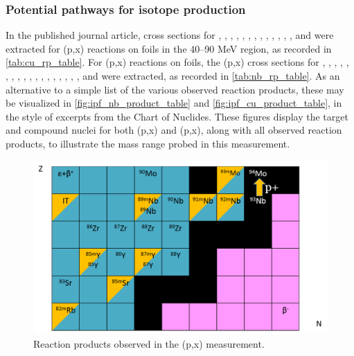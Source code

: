\subsubsection{Potential pathways for isotope production }


In the published journal article, cross sections for  ,  , , , , , , ,  , , , , , and  were extracted for (p,x) reactions  on  foils in the 40--90 MeV region, as recorded in \autoref{tab:cu_rp_table}.
For  (p,x) reactions on  foils, the (p,x) cross sections for , , , , , , , , , , , , , , , , , , and  were extracted, as recorded in \autoref{tab:nb_rp_table}.
As an alternative to a simple list of the various observed reaction products, these may be visualized in \autoref{fig:ipf_nb_product_table} and \autoref{fig:ipf_cu_product_table}, in the style of excerpts from the Chart of  Nuclides.
These figures display the target and compound nuclei  for both  (p,x) and (p,x), along with all observed reaction products, to illustrate the mass range probed in this measurement. 


% 
% 

\begin{figure}
 \centering
 \includegraphics[width=0.75\columnwidth]{./figures/ipf_nb_product_table.png}
 \caption{Reaction products observed in the (p,x) measurement. }
 \label{fig:ipf_nb_product_table}
\end{figure}


